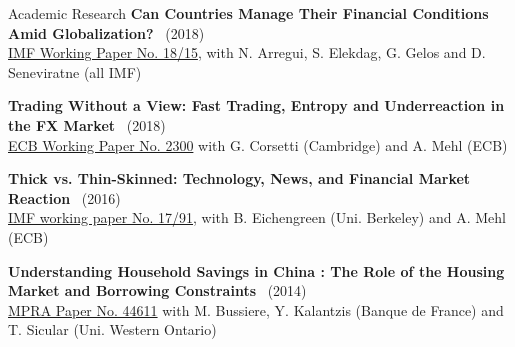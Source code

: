 \documentclass[usegeometry, 10pt, a4paper]{cv} %
\newcommand{\activite}[1]{\textbf{#1}\ }
\begin{document}
\begin{rubriquetableau}[0.95\textwidth]{Academic Research}
\activite{Can Countries Manage Their Financial Conditions Amid Globalization?} (2018) \\
\hspace{0.6cm} \small{\href{https://www.imf.org/en/Publications/WP/Issues/2018/01/24/Can-Countries-Manage-Their-Financial-Conditions-Amid-Globalization-45581}{IMF Working Paper No. 18/15}, with N. Arregui, S. Elekdag, G. Gelos and D. Seneviratne (all IMF)}
\vspace{0.4cm} 

\activite{Trading Without a View: Fast Trading, Entropy and Underreaction in the FX  Market} (2018) \\
\hspace{0.6cm}
\small{\href{https://www.ecb.europa.eu/pub/pdf/scpwps/ecb.wp2300~68bda93b78.en.pdf}{ECB
    Working Paper No. 2300} with G. Corsetti (Cambridge) and A. Mehl (ECB)}
\vspace{0.4cm} 

\activite{Thick vs. Thin-Skinned: Technology, News, and Financial Market Reaction} (2016) \\
\hspace{0.6cm} \small{\href{https://www.imf.org/en/Publications/WP/Issues/2017/04/07/Thick-vs-44810}{IMF working paper No. 17/91}, with B. Eichengreen (Uni. Berkeley) and A. Mehl (ECB)}
\vspace{0.4cm} 

    
\activite{Understanding Household Savings in China : The Role of the Housing Market and Borrowing Constraints} (2014)  \\
\hspace{0.6cm}
\small{\href{https://ideas.repec.org/p/pra/mprapa/44611.html}{MPRA Paper
    No. 44611} with M. Bussiere, Y. Kalantzis (Banque de France) and T. Sicular (Uni. Western Ontario)}
\end{rubriquetableau}

\vspace{0.8cm}
\end{document}
